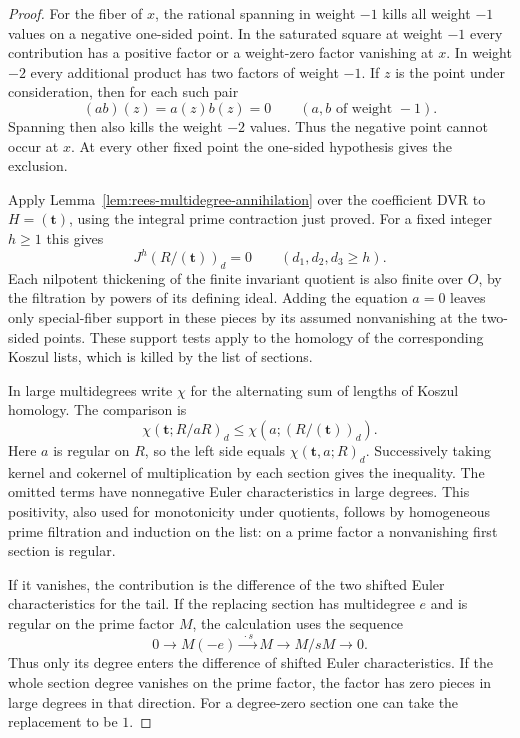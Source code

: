 \begin{proof}
For the fiber of \(x\),
the rational spanning in weight \(-1\) kills all weight
\(-1\) values on a negative one-sided point. In the
saturated square at weight \(-1\) every contribution
has a positive factor or a weight-zero factor vanishing
at \(x\). In weight \(-2\) every additional product has two factors of weight \(-1\). If \(z\) is the point under consideration, then for each such pair
\[
 (ab)(z)=a(z)b(z)=0\qquad(a,b\text{ of weight }-1).
\]
Spanning then also kills the weight \(-2\) values. Thus
the negative point cannot occur at \(x\). At every other
fixed point the one-sided hypothesis gives the exclusion.

Apply Lemma~\ref{lem:rees-multidegree-annihilation} over the
coefficient DVR to \(H=(\mathbf t)\), using the integral prime
contraction just proved. For a fixed integer \(h\ge1\) this gives
\[
      J^h(R/(\mathbf t))_d=0\qquad(d_1,d_2,d_3\ge h).
\] Each nilpotent thickening of
the finite invariant quotient is also finite over \(O\),
by the filtration by powers of its defining ideal.
Adding the equation \(a=0\) leaves only special-fiber support in these
pieces by its assumed nonvanishing at the two-sided
points. These support tests apply to the homology of the
corresponding Koszul lists, which is killed by the list
of sections.

In large multidegrees write \(\chi\) for the alternating
sum of lengths of Koszul homology. The comparison is
\[
   \chi(\mathbf t;R/aR)_d
          \le \chi(a;(R/(\mathbf t))_d).
          \tag{5}\label{eq:local-length-5}
\]
Here \(a\) is regular on \(R\), so the left side equals
\(\chi(\mathbf t,a;R)_d\). Successively taking
kernel and cokernel of multiplication by each section
gives the inequality. The omitted terms have nonnegative
Euler characteristics in large degrees. This positivity,
also used for monotonicity under quotients, follows by
homogeneous prime filtration and induction on the list:
on a prime factor a nonvanishing first section is regular.

If it vanishes, the contribution is the difference of the
two shifted Euler characteristics for the tail. If the replacing section has multidegree \(e\) and is regular on the prime factor \(M\), the calculation uses the sequence
\[
 0\longrightarrow M(-e)\xrightarrow{\ \cdot s\ } M\longrightarrow M/sM\longrightarrow 0 .
\]
Thus only its degree enters the difference of shifted Euler characteristics. If the whole section degree vanishes on the
prime factor, the factor has zero pieces in large degrees
in that direction. For a degree-zero section one can
take the replacement to be \(1\).


\end{proof}

